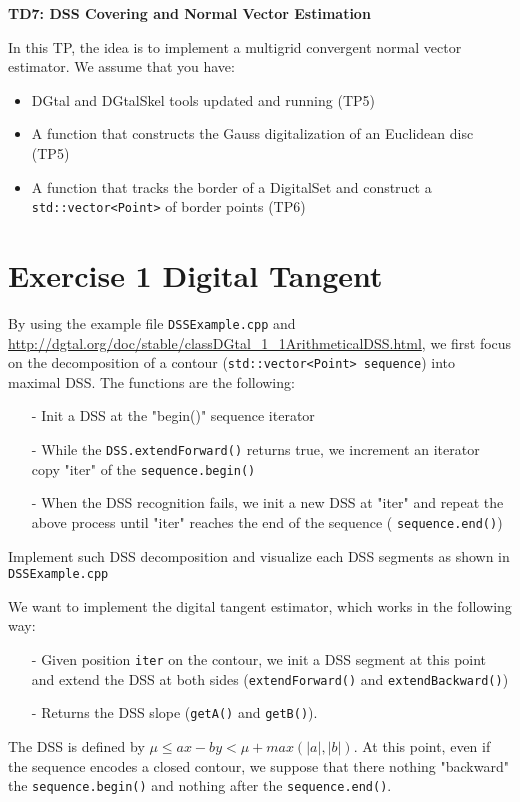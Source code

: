 \documentclass[a4paper, 11pt]{article}
\title{}
\author{}
\date{}
\begin{document}
\begin{center}
	\LARGE \textbf{TD7: DSS Covering and Normal Vector Estimation}
\end{center}

\bigskip
\par In this TP, the idea is to implement a multigrid convergent normal vector estimator. We assume that you have:
\begin{itemize}
	\item DGtal and DGtalSkel tools updated and running (TP5)
	\item A function that constructs the Gauss digitalization of an Euclidean disc (TP5)
	\item A function that tracks the border of a DigitalSet and construct a \texttt{std::vector<Point>} of border points (TP6)
\end{itemize}


\section*{Exercise 1 \rm Digital Tangent}

\par By using the example file \texttt{DSSExample.cpp} and \url{http://dgtal.org/doc/stable/classDGtal_1_1ArithmeticalDSS.html}, we first focus on the decomposition of a contour (\texttt{std::vector<Point> sequence}) into maximal DSS. The functions are the following:
\begin{itemize}
	\item[-] Init a DSS at the "begin()" sequence iterator
	\item[-] While the \texttt{DSS.extendForward()} returns true, we increment an iterator copy "iter" of the \texttt{sequence.begin()} 
	\item[-] When the DSS recognition fails, we init a new DSS at "iter" and repeat the above process until "iter" reaches the end of the sequence ( \texttt{sequence.end()})
\end{itemize}

 Implement such DSS decomposition and visualize each DSS segments as shown in \texttt{DSSExample.cpp}

\vspace{0.7cm}
\par We want to implement the digital tangent estimator, which works in the following way:
	\begin{itemize}
	\item[-] Given position \texttt{iter} on the contour, we init a DSS segment at this point and extend the DSS at both sides (\texttt{extendForward()} and \texttt{extendBackward()})
	\item[-] Returns the DSS slope (\texttt{getA()} and \texttt{getB()}).
	\end{itemize}
 The DSS is defined by $\mu \leq ax - by <\mu + max(|a|,|b|)$. At this point, even if the sequence encodes a closed contour, we suppose that there nothing "backward" the \texttt{sequence.begin()} and nothing after the \texttt{sequence.end()}.
\end{document}
